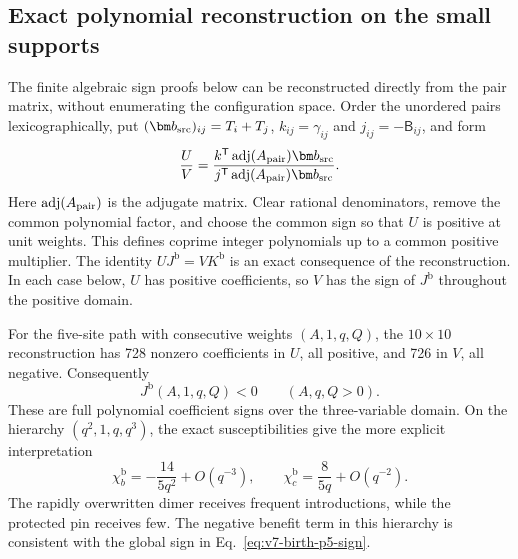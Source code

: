 \documentclass[aps,pre,reprint,amsmath,amssymb,longbibliography]{revtex4-2}
\begin{document}
\subsection{Exact polynomial reconstruction on the small supports}
\label{app:v7-birth-polynomials}
The finite algebraic sign proofs below can be reconstructed directly
from the pair matrix, without enumerating the configuration space.
Order the unordered pairs lexicographically, put
$(\bm b_{\rm src})_{ij}=T_i+T_j$, $k_{ij}=\gamma_{ij}$ and
$j_{ij}=-\mathsf B_{ij}$, and form
\begin{equation}
 \frac{U}{V}
 =\frac{k^{\mathsf T}\operatorname{adj}(A_{\rm pair})\bm b_{\rm src}}
        {j^{\mathsf T}\operatorname{adj}(A_{\rm pair})\bm b_{\rm src}}.
 \label{eq:v7-birth-reconstruction}
\end{equation}
Here $\operatorname{adj}(A_{\rm pair})$ is the adjugate matrix. Clear rational
denominators, remove the common polynomial factor, and choose the
common sign so that $U$ is positive at unit weights. This defines
coprime integer polynomials up to a common positive multiplier.
The identity $UJ^{\mathrm b}=VK^{\mathrm b}$ is an exact consequence
of the reconstruction. In each case below, $U$ has positive
coefficients, so $V$ has the sign of $J^{\mathrm b}$ throughout
the positive domain.

For the five-site path with consecutive weights $(A,1,q,Q)$,
the $10\times10$ reconstruction has 728 nonzero coefficients in
$U$, all positive, and 726 in $V$, all negative. Consequently
\begin{equation}
 J^{\mathrm b}(A,1,q,Q)<0\qquad(A,q,Q>0).
 \label{eq:v7-birth-p5-sign}
\end{equation}
These are full polynomial coefficient signs over the three-variable
domain. On the hierarchy $(q^2,1,q,q^3)$, the exact susceptibilities
give the more explicit interpretation
\begin{equation}
 \chi_b^{\mathrm b}=-\frac{14}{5q^2}+O(q^{-3}),\qquad
 \chi_c^{\mathrm b}=\frac8{5q}+O(q^{-2}).
 \label{eq:v7-birth-p5-asymptotic}
\end{equation}
The rapidly overwritten dimer receives frequent introductions, while
the protected pin receives few. The negative benefit term in this
hierarchy is consistent with the global sign in
Eq.~\eqref{eq:v7-birth-p5-sign}.
\end{document}
